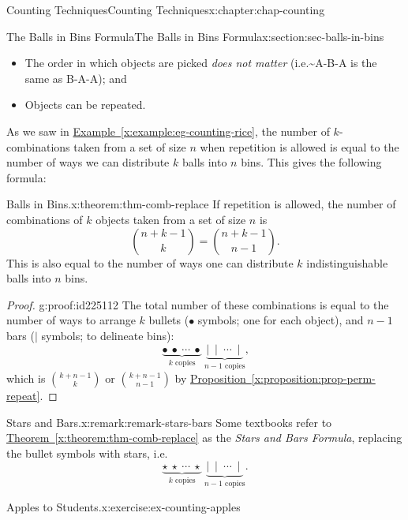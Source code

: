 \documentclass[oneside,10pt,]{book}
\newcommand{\xreffont}{\relax}
\numberwithin{equation}{section}
\begin{document}
\begin{chapterptx}{Counting Techniques}{}{Counting Techniques}{}{}{x:chapter:chap-counting}
\begin{sectionptx}{The Balls in Bins Formula}{}{The Balls in Bins Formula}{}{}{x:section:sec-balls-in-bins}
\begin{itemize}[label=\textbullet]
\item{}The order in which objects are picked \emph{does not matter} (i.e.\textasciitilde{}A-B-A is the same as B-A-A); and%
\item{}Objects can be repeated.%
\end{itemize}
As we saw in \hyperref[x:example:eg-counting-rice]{Example~{\xreffont\ref{x:example:eg-counting-rice}}}, the number of \(k\)-combinations taken from a set of size \(n\) when repetition is allowed is equal to the number of ways we can distribute \(k\) balls into \(n\) bins. This gives the following formula:%
\begin{theorem}{Balls in Bins.}{}{x:theorem:thm-comb-replace}%
If repetition is allowed, the number of combinations of \(k\) objects taken from a set of size \(n\) is%
\begin{equation*}
\binom{n+k-1}{k} = \binom{n+k-1}{n-1}\text{.}
\end{equation*}
This is also equal to the number of ways one can distribute \(k\) indistinguishable balls into \(n\) bins.%
\end{theorem}
\begin{proof}{}{g:proof:id225112}
The total number of these combinations is equal to the number of ways to arrange \(k\) bullets (\(\bullet\) symbols; one for each object), and \(n-1\) bars (\(\mid\) symbols; to delineate bins):%
\begin{equation*}
\underbrace{\bullet \ \bullet \ \cdots \ \bullet}_{k \text{ copies}}\ \underbrace{\mid \ \mid \ \cdots \ \mid}_{n-1 \text{ copies}}\text{,}
\end{equation*}
which is \(\displaystyle\binom{k+n-1}{k}\) or \(\binom{k+n-1}{n-1}\) by \hyperref[x:proposition:prop-perm-repeat]{Proposition~{\xreffont\ref{x:proposition:prop-perm-repeat}}}.%
\end{proof}
\begin{remark}{Stars and Bars.}{x:remark:remark-stars-bars}%
Some textbooks refer to \hyperref[x:theorem:thm-comb-replace]{Theorem~{\xreffont\ref{x:theorem:thm-comb-replace}}} as the \emph{Stars and Bars Formula}, replacing the bullet symbols with stars, i.e.\@%
\begin{equation*}
\underbrace{\star \ \star \ \cdots \ \star}_{k \text{ copies}}\ \underbrace{\mid \ \mid \ \cdots \ \mid}_{n-1 \text{ copies}}\text{.}
\end{equation*}
%
\end{remark}
\begin{inlineexercise}{Apples to Students.}{x:exercise:ex-counting-apples}%

\end{inlineexercise}
\end{sectionptx}
\end{chapterptx}
\end{document}
